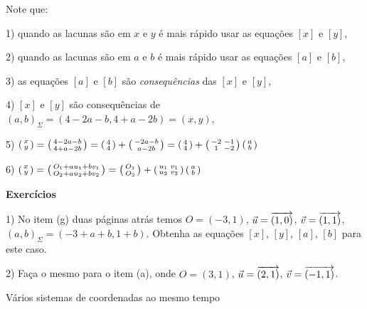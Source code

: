 \documentclass[oneside]{book}
\begin{document}
{\msk

Note que:

1) quando as lacunas são em $x$ e $y$ é mais rápido usar as equações
$[x]$ e $[y]$,

2) quando as lacunas são em $a$ e $b$ é mais rápido usar as equações
$[a]$ e $[b]$,

3) as equações $[a]$ e $[b]$ são {\sl consequências} das $[x]$ e $[y]$,

4) $[x]$ e $[y]$ são consequências de $(a,b)_Σ = (4-2a-b, 4+a-2b) = (x,y)$,

5) $\left (\begin{smallmatrix}x\\ y\\\end{smallmatrix}\right )
    = \left (\begin{smallmatrix}4-2a-b\\ 4+a-2b\\\end{smallmatrix}\right )
    = \left (\begin{smallmatrix}4\\ 4\\\end{smallmatrix}\right ) + \left (\begin{smallmatrix}-2a-b\\ a-2b\\\end{smallmatrix}\right )
    = \left (\begin{smallmatrix}4\\ 4\\\end{smallmatrix}\right ) + \left (\begin{smallmatrix}-2 & -1\\ 1 & -2\\\end{smallmatrix}\right ) \left (\begin{smallmatrix}a\\ b\\\end{smallmatrix}\right )
   $

6) $\left (\begin{smallmatrix}x\\ y\\\end{smallmatrix}\right )
    = \left (\begin{smallmatrix}O_1 +au_1 +bv_1 \\ O_2 + au_2 + bv_2\\\end{smallmatrix}\right )
    = \left (\begin{smallmatrix}O_1\\ O_2\\\end{smallmatrix}\right ) + \left (\begin{smallmatrix}u_1 & v_1\\ u_2 & v_2\\\end{smallmatrix}\right ) \left (\begin{smallmatrix}a\\ b\\\end{smallmatrix}\right )
   $

\msk

{\bf Exercícios}

\ssk

1) No item (g) duas páginas atrás temos $O=(-3,1)$, $\uu=\V(1,0)$,
$\vv=\V(1,1)$, $(a,b)_Σ = (-3+a+b, 1+b)$. Obtenha as equações $[x]$,
$[y]$, $[a]$, $[b]$ para este caso.

2) Faça o mesmo para o item (a), onde $O=(3,1)$, $\uu=\V(2,1)$,
$\vv=\V(-1,1)$.

}


\newpage



%                                                               
 {Vários sistemas de coordenadas ao mesmo tempo}
\end{document}
